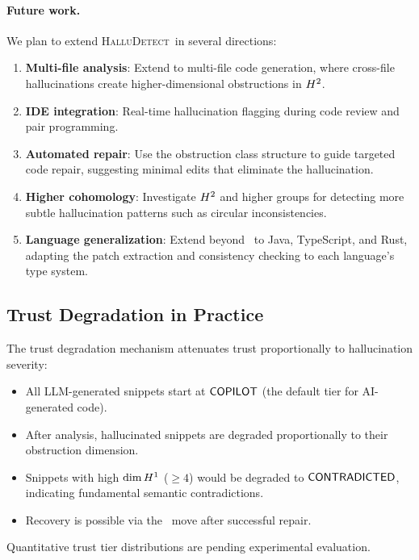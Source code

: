 \documentclass[11pt]{article}
\newcommand{\HalluDetect}{\textsc{HalluDetect}}
\begin{document}
\paragraph{Future work.}
We plan to extend \HalluDetect\ in several directions:
\begin{enumerate}[noitemsep]
  \item \textbf{Multi-file analysis}: Extend to multi-file code
        generation, where cross-file hallucinations create
        higher-dimensional obstructions in $H^{2}$.
  \item \textbf{IDE integration}: Real-time hallucination flagging
        during code review and pair programming.
  \item \textbf{Automated repair}: Use the obstruction class
        structure to guide targeted code repair, suggesting
        minimal edits that eliminate the hallucination.
  \item \textbf{Higher cohomology}: Investigate $H^{2}$ and
        higher groups for detecting more subtle hallucination
        patterns such as circular inconsistencies.
  \item \textbf{Language generalization}: Extend beyond \Python\ to
        Java, TypeScript, and Rust, adapting the patch extraction
        and consistency checking to each language's type system.
\end{enumerate}


\subsection{Trust Degradation in Practice}

The trust degradation mechanism attenuates trust proportionally to
hallucination severity:

\begin{itemize}[noitemsep]
  \item All LLM-generated snippets start at $\mathsf{COPILOT}$ (the default
        tier for AI-generated code).
  \item After analysis, hallucinated snippets are degraded proportionally
        to their obstruction dimension.
  \item Snippets with high $\dim H^{1}$ ($\geq 4$) would be degraded
        to $\mathsf{CONTRADICTED}$, indicating fundamental semantic contradictions.
  \item Recovery is possible via the \PROMOTE\ move after successful repair.
\end{itemize}
Quantitative trust tier distributions are pending experimental evaluation.
\end{document}
